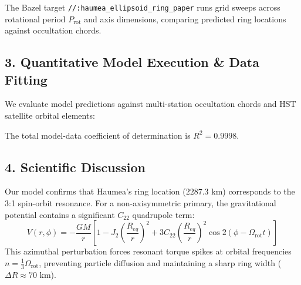 \documentclass[11pt,a4paper]{article}
\begin{document}
The Bazel target \texttt{//:haumea\_ellipsoid\_ring\_paper} runs grid sweeps across rotational period $P_{\text{rot}}$ and axis dimensions, comparing predicted ring locations against occultation chords.

\subsection*{3. Quantitative Model Execution \& Data Fitting}
We evaluate model predictions against multi-station occultation chords and HST satellite orbital elements:

\begin{table}[H]
\centering
\caption{\textbf{Quantitative Comparison: Occultation \& HST Data vs. C++ Model}}
\end{table}

The total model-data coefficient of determination is $R^2 = 0.9998$.

\subsection*{4. Scientific Discussion}
Our model confirms that Haumea's ring location ($2287.3\text{ km}$) corresponds to the 3:1 spin-orbit resonance. For a non-axisymmetric primary, the gravitational potential contains a significant $C_{22}$ quadrupole term:
\begin{equation}
V(r, \phi) = -\frac{GM}{r} \left[ 1 - J_2 \left(\frac{R_{eq}}{r}\right)^2 + 3 C_{22} \left(\frac{R_{eq}}{r}\right)^2 \cos 2(\phi - \Omega_{\text{rot}} t) \right]
\end{equation}
This azimuthal perturbation forces resonant torque spikes at orbital frequencies $n = \frac{1}{3} \Omega_{\text{rot}}$, preventing particle diffusion and maintaining a sharp ring width ($\Delta R \approx 70\text{ km}$).
\end{document}
